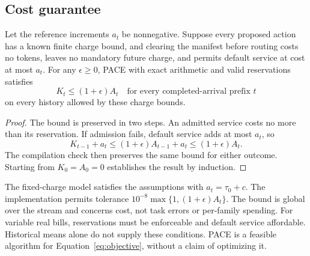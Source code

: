 \subsection{Cost guarantee}
\label{sec:guarantee}

\begin{theorem}
\label{thm:cost-protection}
Let the reference increments $a_t$ be nonnegative.
Suppose every proposed action has a known finite charge bound, and clearing the manifest before routing costs no tokens, leaves no mandatory future charge, and permits default service at cost at most $a_t$.
For any $\epsilon\geq0$, PACE with exact arithmetic and valid reservations satisfies
\begin{equation}
K_t\leq(1+\epsilon)A_t
\quad\text{for every completed-arrival prefix }t
\label{eq:cost-guarantee}
\end{equation}
on every history allowed by these charge bounds.
\end{theorem}

\begin{proof}
The bound is preserved in two steps.
An admitted service costs no more than its reservation.
If admission fails, default service adds at most $a_t$, so
\[
K_{t-1}+a_t\leq(1+\epsilon)A_{t-1}+a_t\leq(1+\epsilon)A_t.
\]
The compilation check then preserves the same bound for either outcome.
Starting from $K_0=A_0=0$ establishes the result by induction.
\end{proof}

The fixed-charge model satisfies the assumptions with $a_t=\tau_0+c$.
The implementation permits tolerance $10^{-8}\max\{1,(1+\epsilon)A_t\}$.
The bound is global over the stream and concerns cost, not task errors or per-family spending.
For variable real bills, reservations must be enforceable and default service affordable.
Historical means alone do not supply these conditions.
PACE is a feasible algorithm for Equation~\ref{eq:objective}, without a claim of optimizing it.
